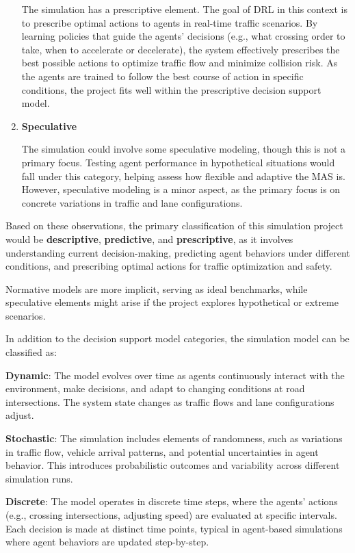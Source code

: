 \begin{enumerate}
          The simulation has a prescriptive element.
      The goal of DRL in this context is to prescribe optimal actions to agents in real-time traffic scenarios. By learning policies that guide the agents' decisions (e.g., what crossing order to take, when to accelerate or decelerate), the system effectively prescribes the best possible actions to optimize traffic flow and minimize collision risk. As the agents are trained to follow the best course of action in specific conditions, the project fits well within the prescriptive decision support model.
      
    \item \textbf{Speculative}

          The simulation could involve some speculative modeling, though this is not a primary focus.
      Testing agent performance in hypothetical situations would fall under this category, helping assess how flexible and adaptive the MAS is. However, speculative modeling is a minor aspect, as the primary focus is on concrete variations in traffic and lane configurations.
      
\end{enumerate}

Based on these observations, the primary classification of this simulation project would be \textbf{descriptive}, \textbf{predictive}, and \textbf{prescriptive}, as it involves understanding current decision-making, predicting agent behaviors under different conditions, and prescribing optimal actions for traffic optimization and safety.

Normative models are more implicit, serving as ideal benchmarks, while speculative elements might arise if the project explores hypothetical or extreme scenarios.

In addition to the decision support model categories, the simulation model can be classified as:

      \textbf{Dynamic}: The model evolves over time as agents continuously interact with the environment, make decisions, and adapt to changing conditions at road intersections. The system state changes as traffic flows and lane configurations adjust.
      
      \textbf{Stochastic}: The simulation includes elements of randomness, such as variations in traffic flow, vehicle arrival patterns, and potential uncertainties in agent behavior. This introduces probabilistic outcomes and variability across different simulation runs.
      
      \textbf{Discrete}: The model operates in discrete time steps, where the agents' actions (e.g., crossing intersections, adjusting speed) are evaluated at specific intervals. Each decision is made at distinct time points, typical in agent-based simulations where agent behaviors are updated step-by-step.
      
